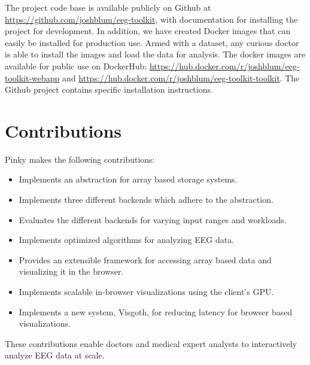 The project code base is available publicly on Github \cite{github} at
\url{https://github.com/joshblum/eeg-toolkit}, with documentation for
installing the project for development. In addition, we have created Docker
\cite{docker} images that can easily be installed for production use. Armed
with a dataset, any curious doctor is able to install the images and load the
data for analysis. The docker images are available for public use on DockerHub:
\url{https://hub.docker.com/r/joshblum/eeg-toolkit-webapp} and
\url{https://hub.docker.com/r/joshblum/eeg-toolkit-toolkit}. The Github project
contains specific installation instructions.

\section{Contributions}

Pinky makes the following contributions:

\begin{itemize}

  \item Implements an abstraction for array based storage systems.

  \item Implements three different backends which adhere to the abstraction.

  \item Evaluates the different backends for varying input ranges and
    workloads.

  \item Implements optimized algorithms for analyzing EEG data.

  \item Provides an extensible framework for accessing array based data and
    visualizing it in the browser.

  \item Implements scalable in-browser visualizations using the client's GPU.

  \item Implements a new system, Visgoth, for reducing latency for browser
    based visualizations.

\end{itemize}

These contributions enable doctors and medical expert analysts to interactively
analyze EEG data at scale.

